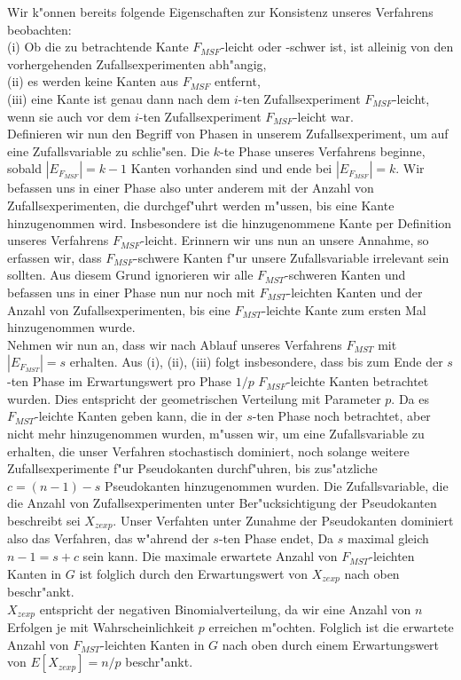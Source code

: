 Wir k"onnen bereits folgende Eigenschaften zur Konsistenz unseres Verfahrens
    beobachten:\\ 
(i) Ob die zu betrachtende Kante $F_{MSF}$-leicht oder -schwer ist, 
    ist alleinig von den vorhergehenden Zufallsexperimenten abh"angig,\\
(ii) es werden keine Kanten aus $F_{MSF}$ entfernt,\\
(iii) eine Kante ist genau dann nach dem $i$-ten Zufallsexperiment 
    $F_{MSF}$-leicht, wenn sie auch vor dem $i$-ten Zufallsexperiment $F_{MSF}$-leicht
    war.\\
Definieren wir nun den Begriff von Phasen in unserem Zufallsexperiment, um auf
    eine Zufallsvariable zu schlie"sen.
    Die $k$-te Phase unseres Verfahrens beginne, sobald $|E_{F_{MSF}}| = k-1$ Kanten
    vorhanden sind und ende bei $|E_{F_{MSF}}| = k$.
    Wir befassen uns in einer Phase also unter anderem mit der Anzahl von 
    Zufallsexperimenten, die durchgef"uhrt werden m"ussen, 
    bis eine Kante hinzugenommen wird.
    Insbesondere ist die hinzugenommene Kante per Definition unseres Verfahrens
    $F_{MSF}$-leicht. Erinnern wir uns nun an unsere Annahme, so erfassen wir,
    dass $F_{MSF}$-schwere Kanten f"ur unsere Zufallsvariable irrelevant sein
    sollten. Aus diesem Grund ignorieren wir alle $F_{MST}$-schweren Kanten und
    befassen uns in einer Phase nun nur noch mit $F_{MST}$-leichten Kanten und
    der Anzahl von Zufallsexperimenten, bis eine $F_{MST}$-leichte Kante zum 
    ersten Mal hinzugenommen wurde.\\
Nehmen wir nun an, dass wir nach Ablauf unseres Verfahrens $F_{MST}$ mit
    $|E_{F_{MST}}| = s$ erhalten. Aus (i), (ii), (iii) folgt insbesondere, dass bis zum Ende
    der $s$-ten Phase im Erwartungswert pro Phase $1/p$ $F_{MSF}$-leichte
    Kanten betrachtet wurden. Dies entspricht der geometrischen Verteilung mit
    Parameter $p$.
    Da es $F_{MST}$-leichte Kanten geben kann, die in der $s$-ten Phase noch
    betrachtet, aber nicht mehr hinzugenommen wurden,
    m"ussen wir, um eine Zufallsvariable zu 
    erhalten, die unser Verfahren stochastisch dominiert, noch solange weitere 
    Zufallsexperimente f"ur Pseudokanten durchf"uhren, bis zus"atzliche 
    $c=(n-1)-s$ Pseudokanten hinzugenommen wurden.
    Die Zufallsvariable, die die Anzahl von Zufallsexperimenten unter 
    Ber"ucksichtigung der Pseudokanten
    beschreibt sei
    $X_{zexp}$.
    Unser Verfahten unter Zunahme der Pseudokanten dominiert also das Verfahren,
    das w"ahrend der $s$-ten Phase endet,
    Da $s$ maximal gleich $n-1 = s+c$ sein kann.
    Die maximale erwartete Anzahl von $F_{MST}$-leichten Kanten in $G$ ist folglich durch den
    Erwartungswert von $X_{zexp}$ nach oben beschr"ankt.\\
$X_{zexp}$ entspricht der negativen Binomialverteilung, da wir eine Anzahl von
    $n$ Erfolgen je mit Wahrscheinlichkeit $p$ erreichen m"ochten. 
    Folglich ist die erwartete Anzahl von $F_{MST}$-leichten Kanten in $G$ 
    nach oben durch
    einem Erwartungswert von
    $E[X_{zexp}] = n/p$ beschr"ankt.\\
